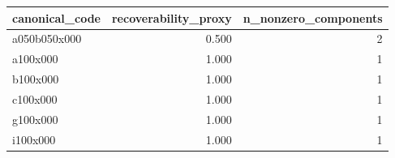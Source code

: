 \begin{tabular}{lrr}
\toprule
canonical_code & recoverability_proxy & n_nonzero_components \\
\midrule
a050b050x000 & 0.500 & 2 \\
a100x000 & 1.000 & 1 \\
b100x000 & 1.000 & 1 \\
c100x000 & 1.000 & 1 \\
g100x000 & 1.000 & 1 \\
i100x000 & 1.000 & 1 \\
\bottomrule
\end{tabular}
